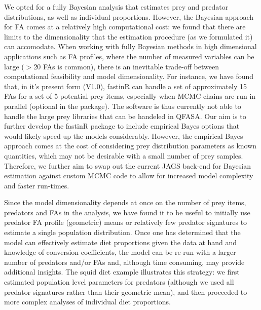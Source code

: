 \documentclass[fleqn,10pt]{wlpeerj}
\begin{document}
We opted for a fully Bayesian analysis that estimates prey and predator
distributions, as well as individual proportions. However, the Bayesian
approach for FA comes at a relatively
high computational cost: we found that there are limits to the dimensionality
that the estimation procedure (as we formulated it) can accomodate. When working with
fully Bayesian methods in high dimensional applications such as FA profiles,
where the number of measured variables can be large ($>$20 FAs is common), there
is an inevitable trade-off between computational feasibility and
model dimensionality. For instance, we have found that, in it's present form (V1.0), fastinR can handle a set of approximately 15 FAs for a set of 5 potential prey items, especially when MCMC chains are run in parallel (optional in the package). The software is thus currently not able to handle the large prey libraries that can be handeled in QFASA. Our aim is to further
develop the fastinR package to include empirical Bayes options \citep[as
described in][]{parnell_bayesian_2012} that would likely speed up
the models considerably. However, the empirical Bayes approach comes at the cost of considering prey
distribution parameters as known quantities, which may not be desirable with a
small number of prey samples. Therefore, we further aim to swap out the current JAGS back-end for Bayesian estimation against custom MCMC code to allow for increased model complexity and faster run-times.

Since the model dimensionality depends at once on the number of prey items, predators and
FAs in the analysis, we have found it to be useful to
initially use
predator FA profile (geometric) means or relatively few predator signatures to
estimate a single population distribution. Once one has determined
that the model can effectively estimate diet proportions given the
data at hand and knowledge of conversion coefficients, the model can
be re-run with a larger number of predators and/or FAs and, although time consuming, may provide additional
insights. The squid diet example illustrates this strategy: we first
estimated population level parameters for predators (although we used
all predator signatures rather than their geometric mean), and then
proceeded to more complex analyses of individual diet proportions.
\end{document}
